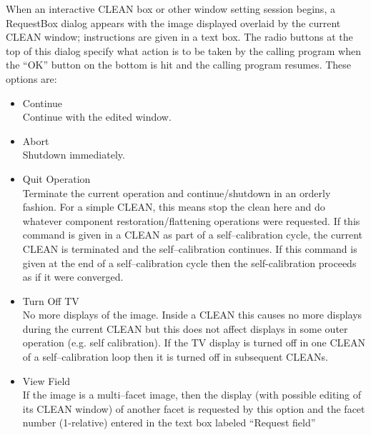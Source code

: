 \documentclass[11pt]{report}
\begin{document}
When an interactive CLEAN box or other window setting session begins,
a RequestBox dialog appears with the image displayed overlaid by the
current CLEAN window; instructions are given in a text box.
The radio buttons at the top of this dialog specify what action is to
be taken by the calling program when the ``OK'' button on the bottom
is hit and the calling program resumes.
These options are:
\begin{itemize}
\item Continue\\
Continue with the edited window.
\item Abort\\
Shutdown immediately.
\item Quit Operation\\
Terminate the current operation and continue/shutdown in an orderly
fashion.
For a simple CLEAN, this means stop the clean here and do whatever
component restoration/flattening operations were requested.
If this command is given in a CLEAN as part of a self--calibration
cycle, the current CLEAN is terminated and the self--calibration
continues.
If this command is given at the end of a self--calibration cycle then
the self-calibration proceeds as if it were converged.
\item Turn Off TV\\
No more displays of the image.
Inside a CLEAN this causes no more displays during the current CLEAN
but this does not affect displays in some outer operation (e.g. self
calibration). 
If the TV display is turned off in one CLEAN of a self--calibration
loop then it is turned off in subsequent CLEANs.
\item View Field\\
If the image is a multi--facet image, then the display (with possible
editing of its CLEAN window) of another facet is requested by this
option and the facet number (1-relative) entered in the text box labeled
``Request field'' 
\end{itemize}
\end{document}
